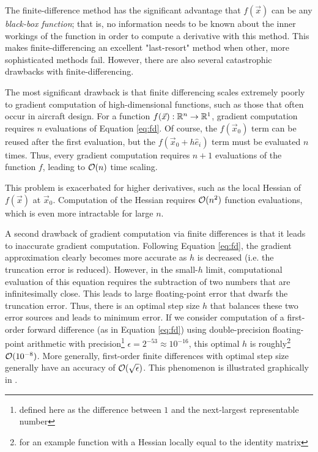 The finite-difference method has the significant advantage that $f(\vec{x})$ can be any \textit{black-box function}; that is, no information needs to be known about the inner workings of the function in order to compute a derivative with this method. This makes finite-differencing an excellent "last-resort" method when other, more sophisticated methods fail. However, there are also several catastrophic drawbacks with finite-differencing.

The most significant drawback is that finite differencing scales extremely poorly to gradient computation of high-dimensional functions, such as those that often occur in aircraft design. For a function $f(\vec{x}): \mathbb{R}^n \to \mathbb{R}^1$, gradient computation requires $n$ evaluations of Equation \ref{eq:fd}. Of course, the $f(\vec{x}_0)$ term can be reused after the first evaluation, but the $f(\vec{x}_0+h\hat{e}_i)$ term must be evaluated $n$ times. Thus, every gradient computation requires $n+1$ evaluations of the function $f$, leading to $\mathcal{O}(n)$ time scaling.

This problem is exacerbated for higher derivatives, such as the local Hessian of $f(\vec{x})$ at $\vec{x}_0$. Computation of the Hessian requires $\mathcal{O}(n^2)$ function evaluations, which is even more intractable for large $n$.

A second drawback of gradient computation via finite differences is that it leads to inaccurate gradient computation. Following Equation \ref{eq:fd}, the gradient approximation clearly becomes more accurate as $h$ is decreased (i.e. the truncation error is reduced). However, in the small-$h$ limit, computational evaluation of this equation requires the subtraction of two numbers that are infinitesimally close. This leads to large floating-point error that dwarfs the truncation error. Thus, there is an optimal step size $h$ that balances these two error sources and leads to minimum error. If we consider computation of a first-order forward difference (as in Equation \ref{eq:fd}) using double-precision floating-point arithmetic with precision\footnote{defined here as the difference between $1$ and the next-largest representable number} $\epsilon = 2^{-53} \approx 10^{-16}$, this optimal $h$ is roughly\footnote{for an example function with a Hessian locally equal to the identity matrix} $\mathcal{O}(10^{-8})$. More generally, first-order finite differences with optimal step size generally have an accuracy of $\mathcal{O}(\sqrt{\epsilon})$. This phenomenon is illustrated graphically in \cite{mdobook}.

